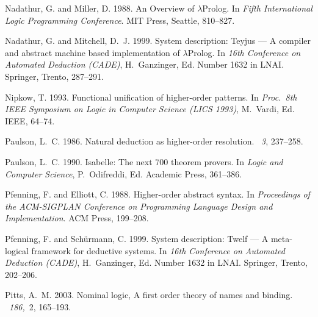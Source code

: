 \documentclass{acmtrans2m}
\begin{document}
\begin{thebibliography}{}
{\sc Nadathur, G.} {\sc and} {\sc Miller, D.} 1988.
\newblock An {Overview} of {$\lambda$Prolog}.
\newblock In {\em {Fifth International Logic Programming Conference}}. MIT
  Press, Seattle, 810--827.

{\sc Nadathur, G.} {\sc and} {\sc Mitchell, D.~J.} 1999.
\newblock System description: {Teyjus} --- {A} compiler and abstract machine
  based implementation of {$\lambda$Prolog}.
\newblock In {\em 16th Conference on Automated Deduction (CADE)},
  {H.~Ganzinger}, Ed. Number 1632 in LNAI. Springer, Trento, 287--291.

{\sc Nipkow, T.} 1993.
\newblock Functional unification of higher-order patterns.
\newblock In {\em Proc.\ 8th {IEEE} Symposium on Logic in Computer Science
  ({LICS} 1993)}, {M.~Vardi}, Ed. IEEE, 64--74.

{\sc Paulson, L.~C.} 1986.
\newblock Natural deduction as higher-order resolution.
~{\em 3}, 237--258.

{\sc Paulson, L.~C.} 1990.
\newblock Isabelle: The next 700 theorem provers.
\newblock In {\em Logic and Computer Science}, {P.~Odifreddi}, Ed. Academic
  Press, 361--386.

{\sc Pfenning, F.} {\sc and} {\sc Elliott, C.} 1988.
\newblock Higher-order abstract syntax.
\newblock In {\em Proceedings of the {ACM}-{SIGPLAN} Conference on Programming
  Language Design and Implementation}. ACM Press, 199--208.

{\sc Pfenning, F.} {\sc and} {\sc Sch{\"u}rmann, C.} 1999.
\newblock System description: Twelf --- {A} meta-logical framework for
  deductive systems.
\newblock In {\em 16th Conference on Automated Deduction (CADE)},
  {H.~Ganzinger}, Ed. Number 1632 in LNAI. Springer, Trento, 202--206.

{\sc Pitts, A.~M.} 2003.
\newblock Nominal logic, {A} first order theory of names and binding.
~{\em 186,\/}~2, 165--193.


\end{thebibliography}
\end{document}
